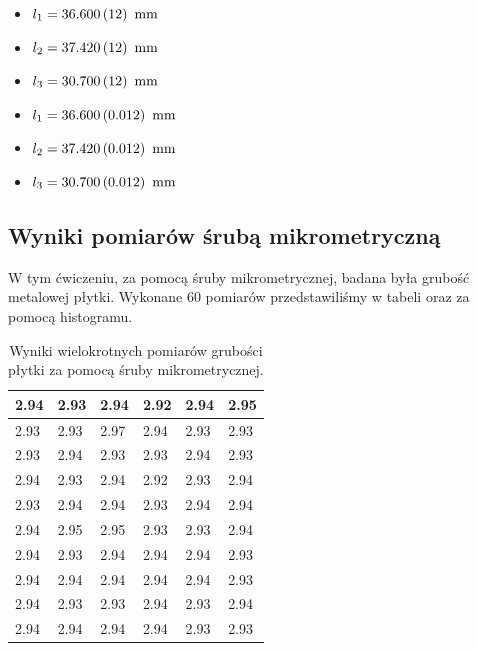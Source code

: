 \documentclass[a4paper]{article}
\begin{document}
\begin{itemize}
\item $l_1 = 36.600 \, (12) \enskip \text{mm}$
\item $l_2 = 37.420 \, (12) \enskip \text{mm}$
\item $l_3 = 30.700 \, (12) \enskip \text{mm}$
\end{itemize}

\begin{itemize}
\item $l_1 = 36.600 \, (0.012) \enskip \text{mm}$
\item $l_2 = 37.420 \, (0.012) \enskip \text{mm}$
\item $l_3 = 30.700 \, (0.012) \enskip \text{mm}$
\end{itemize}

\subsection{Wyniki pomiarów śrubą mikrometryczną}

W tym ćwiczeniu, za pomocą śruby mikrometrycznej, badana była grubość metalowej płytki.
Wykonane 60 pomiarów przedstawiliśmy w tabeli oraz za pomocą histogramu.

\begin{table}
\centering
\begin{tabular}{|l|l|l|l|l|l|}
\hline
2.94 & 2.93 & 2.94 & 2.92 & 2.94 & 2.95 \\
\hline
2.93 & 2.93 & 2.97 & 2.94 & 2.93 & 2.93 \\
\hline
2.93 & 2.94 & 2.93 & 2.93 & 2.94 & 2.93 \\
\hline
2.94 & 2.93 & 2.94 & 2.92 & 2.93 & 2.94 \\
\hline
2.93 & 2.94 & 2.94 & 2.93 & 2.94 & 2.94 \\
\hline
2.94 & 2.95 & 2.95 & 2.93 & 2.93 & 2.94 \\
\hline
2.94 & 2.93 & 2.94 & 2.94 & 2.94 & 2.93 \\
\hline
2.94 & 2.94 & 2.94 & 2.94 & 2.94 & 2.93 \\
\hline
2.94 & 2.93 & 2.93 & 2.94 & 2.93 & 2.94 \\
\hline
2.94 & 2.94 & 2.94 & 2.94 & 2.93 & 2.93 \\
\hline
\end{tabular}
\caption{Wyniki wielokrotnych pomiarów grubości płytki za pomocą śruby mikrometrycznej.}
\end{table}
\end{document}

